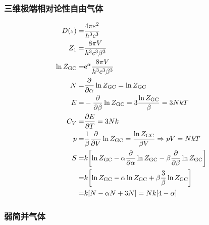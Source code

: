 \subsubsection{三维极端相对论性自由气体}

\begin{align*}
    D(\varepsilon) =     & \frac{4 \pi \varepsilon^2}{h^3 c^3}                                                                        \\
    Z_1 =                & \frac{8 \pi V}{h^3 c^3 \beta^3}                                                                            \\
    \ln{Z_{\text{GC}}} = & \mathrm{e}^{\alpha} \frac{8 \pi V}{h^3 c^3 \beta^3}                                                        \\
    N =                  & \pdv{\alpha} \ln{Z_{\text{GC}}} = \ln{Z_{\text{GC}}}                                                       \\
    E =                  & - \pdv{\beta} \ln{Z_{\text{GC}}} = 3 \frac{\ln{Z_{\text{GC}}}}{\beta} = 3 N k T                            \\
    C_V =                & \pdv{E}{T} = 3 N k                                                                                         \\
    p =                  & \frac{1}{\beta} \pdv{V} \ln{Z_{\text{GC}}} = \frac{\ln{Z_{\text{GC}}}}{\beta V} \Rightarrow p V = N k T    \\
    S =                  & k \qty[\ln{Z_{\text{GC}}} - \alpha \pdv{\alpha} \ln{Z_{\text{GC}}} - \beta \pdv{\beta} \ln{Z_{\text{GC}}}] \\
    =                    & k \qty[\ln{Z_{\text{GC}}} - \alpha \ln{Z_{\text{GC}}} + \beta \frac{3}{\beta} \ln{Z_{\text{GC}}}]          \\
    =                    & k \qty[N - \alpha N + 3 N] = N k \qty[4 - \alpha]
\end{align*}

\subsubsection{弱简并气体}

